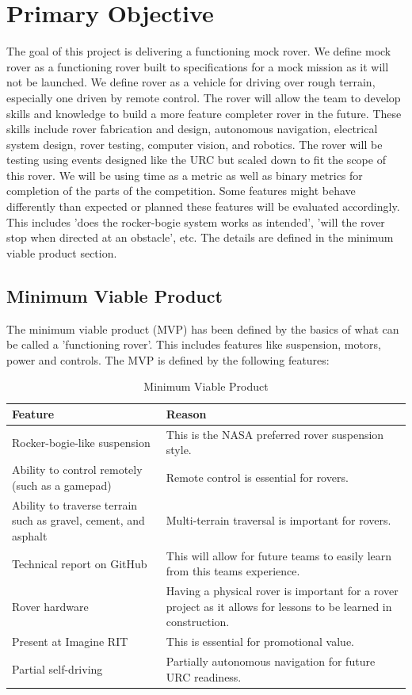 \documentclass[conference]{IEEEtran} %
\begin{document}
\section{Primary Objective}
\label{sec:primary-obj}
The goal of this project is delivering a functioning mock rover.
We define mock rover as a functioning rover built to specifications for a mock mission as it will not be launched. 
We define rover as a vehicle for driving over rough terrain, especially one driven by remote control.
The rover will allow the team to develop skills and knowledge to build a
more feature completer rover in the future. 
These skills include rover fabrication and design, autonomous navigation, electrical system design, rover testing, computer vision, and robotics.
The rover will be testing using events designed like the URC but scaled down to fit the scope of this rover. 
We will be using time as a metric as well as binary metrics for completion of the parts of the competition. 
Some features might behave differently than expected or planned these features will be evaluated accordingly.
This includes ’does the rocker-bogie system works as intended’, ’will the rover stop when directed at an obstacle’, etc. 
The details are defined in the minimum viable product section.

\subsection{Minimum Viable Product}
\label{subsec:mvp}
The minimum viable product (MVP) has been defined by the basics of what can be called a 'functioning rover'. This includes features like suspension, motors, power and controls. The MVP is defined by the following features: 

\begin{table}[hb!]
    \caption{Minimum Viable Product}
    \centering
    {\renewcommand{\arraystretch}{1.5}
    \begin{tabularx}{\linewidth}{LL} 
    \hline
    \textbf{Feature} & \textbf{Reason} \\
    \hline
    Rocker-bogie-like suspension & This is the NASA preferred rover suspension style. \\
    Ability to control remotely (such as a gamepad) & Remote control is essential for rovers. \\
    Ability to traverse terrain such as gravel, cement, and asphalt & Multi-terrain traversal is important for rovers. \\
    Technical report on GitHub & This will allow for future teams to easily learn from this teams experience. \\
    Rover hardware & Having a physical rover is important for a rover project as it allows for lessons to be learned in construction. \\ 
    Present at Imagine RIT & This is essential for promotional value. \\
    Partial self-driving & Partially autonomous navigation for future URC readiness. \\
    \hline
    \end{tabularx}
    }
\label{tab:mvp-one}
\end{table}
\end{document}

